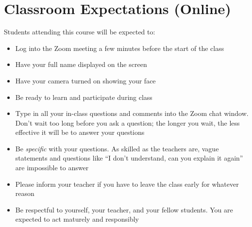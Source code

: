 \documentclass{../../../oss-handout}
\begin{document}
\section{Classroom Expectations (Online)}
Students attending this course will be expected to:
\begin{itemize}[nosep]
\item Log into the Zoom meeting a few minutes before the start of the class
\item Have your full name displayed on the screen
\item Have your camera turned on showing your face
\item Be ready to learn and participate during class
\item Type in all your in-class questions and comments into the Zoom chat
  window. Don't wait too long before you ask a question; the longer you wait,
  the less effective it will be to answer your questions
\item Be \emph{specific} with your questions. As skilled as the teachers are,
  vague statements and questions like ``I don't understand, can you explain it
  again'' are impossible to answer
\item Please inform your teacher if you have to leave the class early for
  whatever reason
\item Be respectful to yourself, your teacher, and your fellow students. You
  are expected to act maturely and responsibly
\end{itemize}
\end{document}
